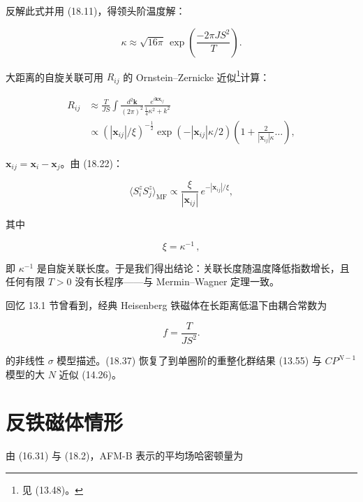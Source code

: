 反解此式并用 (18.11)，得领头阶温度解：

\begin{equation*}
\kappa \approx \sqrt {16 \pi} \, \exp \left( \frac {- 2 \pi J S ^ {2}}{T} \right).
\tag{18.37}
\end{equation*}

大距离的自旋关联可用 $R_{ij}$ 的 Ornstein--Zernicke 近似\footnote{见 (13.48)。}计算：

\begin{align*}
R _ {ij} & \approx \frac {T}{J S} \int \frac {d ^ {2} \mathbf {k}}{( 2 \pi ) ^ {2}} \frac {e ^ {i \mathbf {k} \mathbf {x} _ {ij}}}{\frac {1}{4} \kappa^ {2} + k ^ {2}}\\
& \propto \left( | \mathbf {x} _ {ij} | / \xi \right) ^ {- \frac {1}{2}} \exp \left( - | \mathbf {x} _ {ij} | \kappa / 2 \right) \left( 1 + \frac {2}{| \mathbf {x} _ {ij} | \kappa} \dots \right) ,
\tag{18.38}
\end{align*}

$\mathbf{x}_{ij} = \mathbf{x}_i - \mathbf{x}_j$。由 (18.22)：

\begin{equation*}
\langle S _ {i} ^ {z} S _ {j} ^ {z} \rangle_{\mathrm{MF}} \propto \frac {\xi}{| \mathbf {x} _ {ij} |} \, e ^ {- | \mathbf {x} _ {ij} | / \xi} ,
\tag{18.39}
\end{equation*}

其中

\begin{equation*}
\xi = \kappa^ {- 1} \, ,
\tag{18.40}
\end{equation*}

即 $\kappa^{-1}$ 是自旋关联长度。于是我们得出结论：关联长度随温度降低指数增长，且任何有限 $T > 0$ 没有长程序——与 Mermin--Wagner 定理一致。

回忆 13.1 节曾看到，经典 Heisenberg 铁磁体在长距离低温下由耦合常数为

\begin{equation*}
f = \frac {T}{J S ^ {2}}.
\tag{18.41}
\end{equation*}

的非线性 {$\sigma$} 模型描述。(18.37) 恢复了到单圈阶的重整化群结果 (13.55) 与 $CP^{N-1}$ 模型的大 $N$ 近似 (14.26)。

\section{反铁磁体情形}

由 (16.31) 与 (18.2)，AFM-B 表示的平均场哈密顿量为

